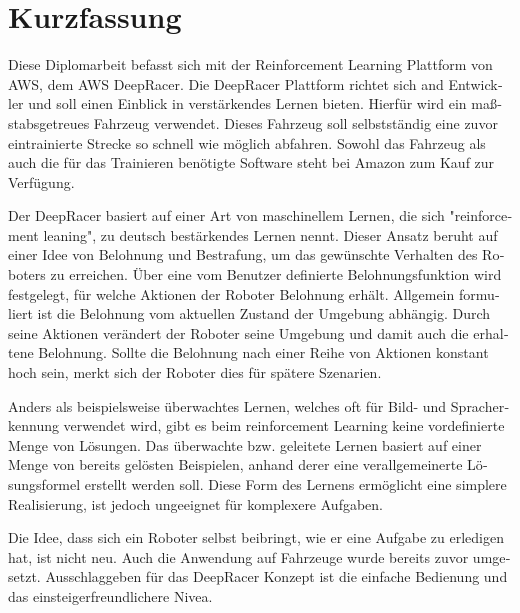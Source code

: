\chapter{Kurzfassung}
\begin{german}
Diese Diplomarbeit befasst sich mit der Reinforcement Learning Plattform von AWS, dem AWS DeepRacer. Die DeepRacer Plattform richtet sich and Entwickler und soll einen Einblick in verstärkendes Lernen bieten. Hierfür wird ein maßstabsgetreues Fahrzeug verwendet. Dieses Fahrzeug soll selbstständig eine zuvor eintrainierte Strecke so schnell wie möglich abfahren. Sowohl das Fahrzeug als auch die für das Trainieren benötigte Software steht bei Amazon zum Kauf zur Verfügung.

Der DeepRacer basiert auf einer Art von maschinellem Lernen, die sich "reinforcement leaning", zu deutsch bestärkendes Lernen nennt. Dieser Ansatz beruht auf einer Idee von Belohnung und Bestrafung, um das gewünschte Verhalten des Roboters zu erreichen. Über eine vom Benutzer definierte Belohnungsfunktion wird festgelegt, für welche Aktionen der Roboter Belohnung erhält. Allgemein formuliert ist die Belohnung vom aktuellen Zustand der Umgebung abhängig. Durch seine Aktionen verändert der Roboter seine Umgebung und damit auch die erhaltene Belohnung. Sollte die Belohnung nach einer Reihe von Aktionen konstant hoch sein, merkt sich der Roboter dies für spätere Szenarien.

Anders als beispielsweise überwachtes Lernen, welches oft für Bild- und Spracherkennung verwendet wird, gibt es beim reinforcement Learning keine vordefinierte Menge von Lösungen. Das überwachte bzw. geleitete Lernen basiert auf einer Menge von bereits gelösten Beispielen, anhand derer eine verallgemeinerte Lösungsformel erstellt werden soll. Diese Form des Lernens ermöglicht eine simplere Realisierung, ist jedoch ungeeignet für komplexere Aufgaben. 

Die Idee, dass sich ein Roboter selbst beibringt, wie er eine Aufgabe zu erledigen hat, ist nicht neu. Auch die Anwendung auf Fahrzeuge wurde bereits zuvor umgesetzt. Ausschlaggeben für das DeepRacer Konzept ist die einfache Bedienung und das einsteigerfreundlichere Nivea. 
\end{german}
%
